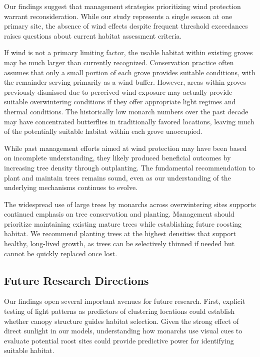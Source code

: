 Our findings suggest that management strategies prioritizing wind protection warrant reconsideration. While our study represents a single season at one primary site, the absence of wind effects despite frequent threshold exceedances raises questions about current habitat assessment criteria.

If wind is not a primary limiting factor, the usable habitat within existing groves may be much larger than currently recognized. Conservation practice often assumes that only a small portion of each grove provides suitable conditions, with the remainder serving primarily as a wind buffer. However, areas within groves previously dismissed due to perceived wind exposure may actually provide suitable overwintering conditions if they offer appropriate light regimes and thermal conditions. The historically low monarch numbers over the past decade may have concentrated butterflies in traditionally favored locations, leaving much of the potentially suitable habitat within each grove unoccupied. %

While past management efforts aimed at wind protection may have been based on incomplete understanding, they likely produced beneficial outcomes by increasing tree density through outplanting. The fundamental recommendation to plant and maintain trees remains sound, even as our understanding of the underlying mechanisms continues to evolve.

The widespread use of large trees by monarchs across overwintering sites supports continued emphasis on tree conservation and planting. Management should prioritize maintaining existing mature trees while establishing future roosting habitat. We recommend planting trees at the highest densities that support healthy, long-lived growth, as trees can be selectively thinned if needed but cannot be quickly replaced once lost.

\subsection{Future Research Directions}

Our findings open several important avenues for future research. First, explicit testing of light patterns as predictors of clustering locations could establish whether canopy structure guides habitat selection. Given the strong effect of direct sunlight in our models, understanding how monarchs use visual cues to evaluate potential roost sites could provide predictive power for identifying suitable habitat.

